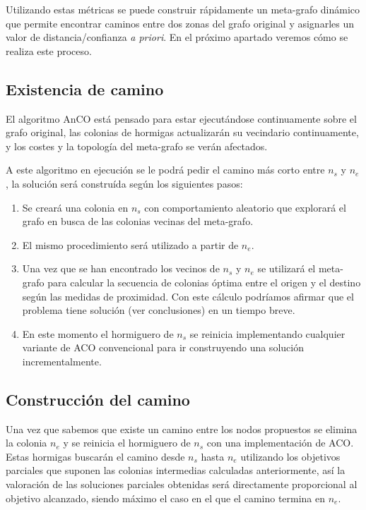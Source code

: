 \documentclass{llncs}
\begin{document}
Utilizando estas métricas se puede construir rápidamente un meta-grafo dinámico que permite encontrar caminos entre dos zonas del grafo original y asignarles un valor de distancia/confianza \textit{a priori}.
En el próximo apartado veremos cómo se realiza este proceso.

\subsection{Existencia de camino}
El algoritmo AnCO está pensado para estar ejecutándose continuamente sobre el grafo original, las colonias de hormigas actualizarán su vecindario continuamente, y los costes y la topología del meta-grafo se verán afectados.

A este algoritmo en ejecución se le podrá pedir el camino más corto entre $n_s$ y $n_e$, la solución será construída según los siguientes pasos:

\begin{enumerate}
  \item Se creará una colonia en $n_s$ con comportamiento aleatorio que explorará el grafo en busca de las colonias vecinas del meta-grafo.
  \item El mismo procedimiento será utilizado a partir de $n_e$.
  \item Una vez que se han encontrado los vecinos de $n_s$ y $n_e$ se utilizará el meta-grafo para calcular la secuencia de colonias óptima entre el origen y el destino según las medidas de proximidad. Con este cálculo podríamos afirmar que el problema tiene solución (ver conclusiones) en un tiempo breve.
  \item En este momento el hormiguero de $n_s$ se reinicia implementando cualquier variante de ACO convencional para ir construyendo una solución incrementalmente.
\end{enumerate}

\subsection{Construcción del camino}
Una vez que sabemos que existe un camino entre los nodos propuestos se elimina la colonia $n_e$ y se reinicia el hormiguero de $n_s$ con una implementación de ACO.
Estas hormigas buscarán el camino desde $n_s$ hasta $n_e$ utilizando los objetivos parciales que suponen las colonias intermedias calculadas anteriormente, así la valoración de las soluciones parciales obtenidas será directamente proporcional al objetivo alcanzado, siendo máximo el caso en el que el camino termina en $n_e$.
\end{document}
